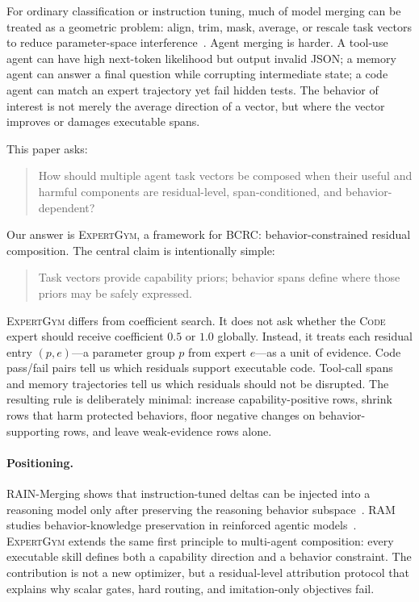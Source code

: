 \documentclass{article}
\newcommand{\method}{\textsc{ExpertGym}\xspace}
\newcommand{\bcrc}{\textsc{BCRC}\xspace}
\newcommand{\code}{\textsc{Code}\xspace}
\newcommand{\rain}{\textsc{RAIN}\xspace}
\newcommand{\ram}{\textsc{RAM}\xspace}
\begin{document}
For ordinary classification or instruction tuning, much of model merging can be treated as a geometric problem: align, trim, mask, average, or rescale task vectors to reduce parameter-space interference~\citep{ilharco2023editing,yadav2023ties,yu2023dare,deep2024della,gargiulo2025tsv,cheng2025wudi}.  Agent merging is harder.  A tool-use agent can have high next-token likelihood but output invalid JSON; a memory agent can answer a final question while corrupting intermediate state; a code agent can match an expert trajectory yet fail hidden tests.  The behavior of interest is not merely the average direction of a vector, but where the vector improves or damages executable spans.

This paper asks:

\begin{quote}
How should multiple agent task vectors be composed when their useful and harmful components are residual-level, span-conditioned, and behavior-dependent?
\end{quote}

Our answer is \method, a framework for \bcrc: behavior-constrained residual composition.  The central claim is intentionally simple:

\begin{quote}
Task vectors provide capability priors; behavior spans define where those priors may be safely expressed.
\end{quote}

\method differs from coefficient search.  It does not ask whether the \code expert should receive coefficient $0.5$ or $1.0$ globally.  Instead, it treats each residual entry $(p,e)$---a parameter group $p$ from expert $e$---as a unit of evidence.  Code pass/fail pairs tell us which residuals support executable code.  Tool-call spans and memory trajectories tell us which residuals should not be disrupted.  The resulting rule is deliberately minimal: increase capability-positive rows, shrink rows that harm protected behaviors, floor negative changes on behavior-supporting rows, and leave weak-evidence rows alone.

\paragraph{Positioning.}
\rain-Merging shows that instruction-tuned deltas can be injected into a reasoning model only after preserving the reasoning behavior subspace~\citep{huang2026rain}.  \ram studies behavior-knowledge preservation in reinforced agentic models~\citep{yuan2026ram}.  \method extends the same first principle to multi-agent composition: every executable skill defines both a capability direction and a behavior constraint.  The contribution is not a new optimizer, but a residual-level attribution protocol that explains why scalar gates, hard routing, and imitation-only objectives fail.
\end{document}
